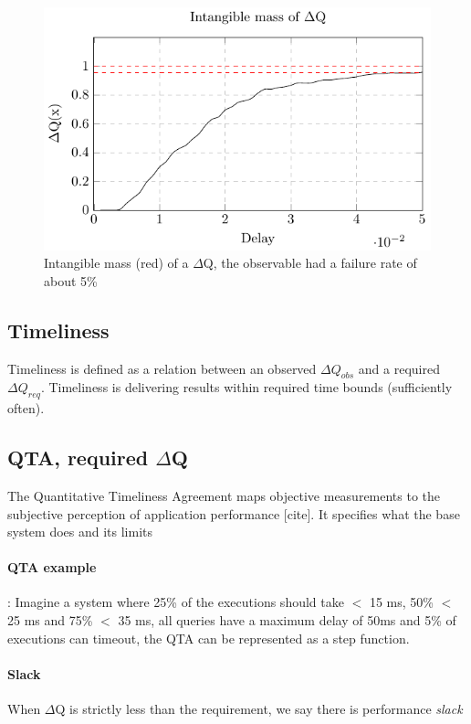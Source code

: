     \begin{figure}[H]
        \begin{center}
            \includegraphics{tikz/intangible.pdf}
        \end{center}
        \caption{Intangible mass (red) of a $\Delta$Q, the observable had a failure rate of about 5\% }
    \end{figure}

    \subsection{Timeliness}
        Timeliness is defined as a relation between an observed $\Delta Q_{obs}$ and a required $\Delta Q_{req}$. Timeliness is delivering results within required time bounds (sufficiently often).
     
    \subsection{QTA, required $\Delta$Q}
         The Quantitative Timeliness Agreement maps objective measurements to the subjective perception of application performance [cite]. It specifies what the base system does and its limits
         \paragraph{QTA example}: Imagine a system where 25\% of the executions should take $<$ 15 ms, 50\% $<$ 25 ms and 75\% $<$ 35 ms, all queries have a maximum delay of 50ms and 5\% of executions can timeout, the QTA can be represented as a step function.
    
        \paragraph{Slack} When $\Delta$Q is strictly less than the requirement, we say there is performance \textit{slack}

